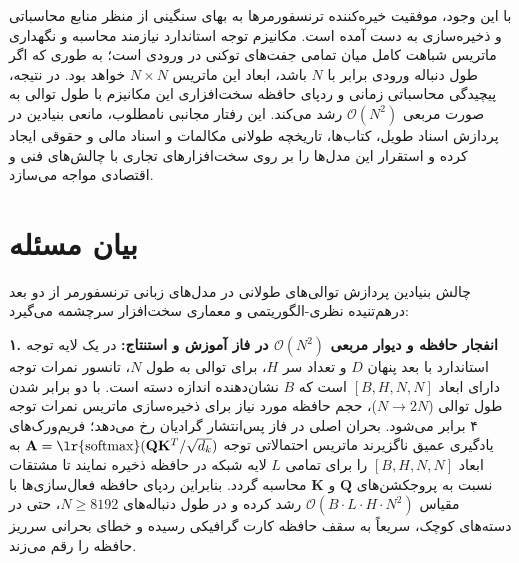 \documentclass[12pt,a4paper]{report}
\theoremstyle{definition}
\begin{document}
با این وجود، موفقیت خیره‌کننده ترنسفورمرها به بهای سنگینی از منظر منابع محاسباتی و ذخیره‌سازی به دست آمده است. مکانیزم توجه استاندارد نیازمند محاسبه و نگهداری ماتریس شباهت کامل میان تمامی جفت‌های توکنی در ورودی است؛ به طوری که اگر طول دنباله ورودی برابر با $N$ باشد، ابعاد این ماتریس $N \times N$ خواهد بود. در نتیجه، پیچیدگی محاسباتی زمانی  و ردپای حافظه سخت‌افزاری  این مکانیزم با طول توالی به صورت مربعی $\mathcal{O}(N^2)$ رشد می‌کند. این رفتار مجانبی نامطلوب، مانعی بنیادین در پردازش اسناد طویل، کتاب‌ها، تاریخچه طولانی مکالمات و اسناد مالی و حقوقی ایجاد کرده و استقرار این مدل‌ها را بر روی سخت‌افزارهای تجاری با چالش‌های فنی و اقتصادی مواجه می‌سازد.

\section{بیان مسئله}
چالش بنیادین پردازش توالی‌های طولانی در مدل‌های زبانی ترنسفورمر از دو بعد درهم‌تنیده نظری-الگوریتمی و معماری سخت‌افزار سرچشمه می‌گیرد:

\textbf{۱. انفجار حافظه و دیوار مربعی $\mathcal{O}(N^2)$ در فاز آموزش و استنتاج:}
در یک لایه توجه استاندارد با بعد پنهان $D$ و تعداد سر $H$، برای توالی به طول $N$، تانسور نمرات توجه دارای ابعاد $[B, H, N, N]$ است که $B$ نشان‌دهنده اندازه دسته  است. با دو برابر شدن طول توالی ($N \to 2N$)، حجم حافظه مورد نیاز برای ذخیره‌سازی ماتریس نمرات توجه ۴ برابر می‌شود. بحران اصلی در فاز پس‌انتشار گرادیان  رخ می‌دهد؛ فریم‌ورک‌های یادگیری عمیق ناگزیرند ماتریس احتمالاتی توجه $\mathbf{A} = \text{\lr{softmax}}(\mathbf{Q}\mathbf{K}^T / \sqrt{d_k})$ به ابعاد $[B, H, N, N]$ را برای تمامی $L$ لایه شبکه در حافظه  ذخیره نمایند تا مشتقات نسبت به پروجکشن‌های $\mathbf{Q}$ و $\mathbf{K}$ محاسبه گردد. بنابراین ردپای حافظه فعال‌سازی‌ها با مقیاس $\mathcal{O}(B \cdot L \cdot H \cdot N^2)$ رشد کرده و در طول دنباله‌های $N \ge 8192$، حتی در دسته‌های کوچک، سریعاً به سقف حافظه کارت گرافیکی رسیده و خطای بحرانی سرریز حافظه  را رقم می‌زند.
\end{document}
